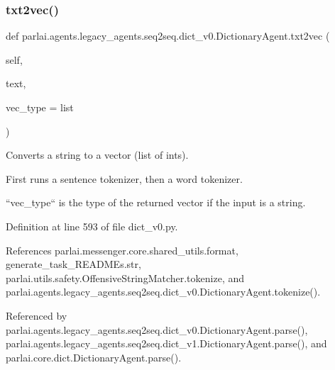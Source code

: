 \subsubsection{\texorpdfstring{txt2vec()}{txt2vec()}}
{\footnotesize\ttfamily def parlai.\+agents.\+legacy\+\_\+agents.\+seq2seq.\+dict\+\_\+v0.\+Dictionary\+Agent.\+txt2vec (\begin{DoxyParamCaption}\item[{}]{self,  }\item[{}]{text,  }\item[{}]{vec\+\_\+type = {\ttfamily list} }\end{DoxyParamCaption})}

\begin{DoxyVerb}Converts a string to a vector (list of ints).

First runs a sentence tokenizer, then a word tokenizer.

``vec_type`` is the type of the returned vector if the input is a string.
\end{DoxyVerb}
 

Definition at line 593 of file dict\+\_\+v0.\+py.



References parlai.\+messenger.\+core.\+shared\+\_\+utils.\+format, generate\+\_\+task\+\_\+\+R\+E\+A\+D\+M\+Es.\+str, parlai.\+utils.\+safety.\+Offensive\+String\+Matcher.\+tokenize, and parlai.\+agents.\+legacy\+\_\+agents.\+seq2seq.\+dict\+\_\+v0.\+Dictionary\+Agent.\+tokenize().



Referenced by parlai.\+agents.\+legacy\+\_\+agents.\+seq2seq.\+dict\+\_\+v0.\+Dictionary\+Agent.\+parse(), parlai.\+agents.\+legacy\+\_\+agents.\+seq2seq.\+dict\+\_\+v1.\+Dictionary\+Agent.\+parse(), and parlai.\+core.\+dict.\+Dictionary\+Agent.\+parse().

